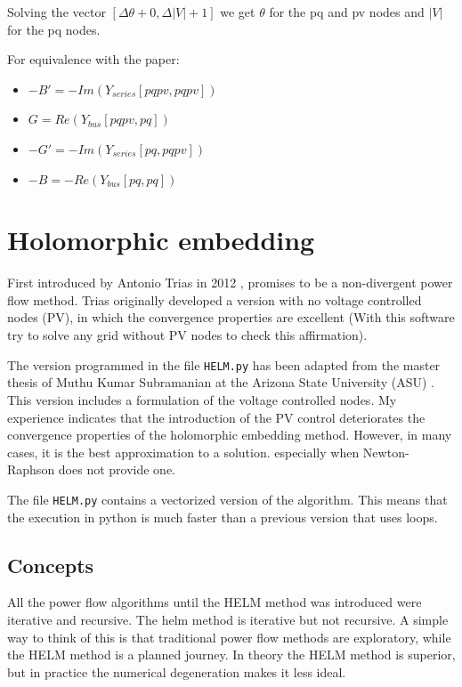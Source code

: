 \documentclass[a4paper,twoside,fleqn]{tufte-book}
\begin{document}
Solving the vector $[\Delta \theta + 0, \Delta |V| + 1]$ we get $\theta$ for the pq and pv nodes and $|V|$ for the pq nodes.\newline

For equivalence with the paper:\newline

\begin{itemize}
	\item $-B' = -Im(Y_{series}[pqpv, pqpv])$
	\item $G = Re(Y_{bus}[pqpv, pq])$
	\item $-G' = -Im(Y_{series}[pq, pqpv])$
	\item $-B = -Re(Y_{bus}[pq, pq])$\newline
\end{itemize}


\section{Holomorphic embedding}

First introduced by Antonio Trias in 2012 \cite{TriasHELM}, promises to be a non-divergent power flow method. Trias originally developed a version with no voltage controlled nodes (PV), in which the convergence properties are excellent (With this software try to solve any grid without PV nodes to check this affirmation). 

The version programmed in the file \verb|HELM.py| has been adapted from the master thesis of Muthu Kumar Subramanian at the Arizona State University (ASU) \cite{subramanian2014application}. This version includes a formulation of the voltage controlled nodes. My experience indicates that the introduction of the PV control deteriorates the convergence properties of the holomorphic embedding method. However, in many cases, it is the best approximation to a solution. especially when Newton-Raphson does not provide one.

The file \verb|HELM.py| contains a vectorized version of the algorithm. This means that the execution in python is much faster than a previous version that uses loops.

\subsection{Concepts}

All the power flow algorithms until the HELM method was introduced were iterative and recursive. The helm method is iterative but not recursive. A simple way to think of this is that traditional power flow methods are exploratory, while the HELM method is a planned journey. In theory the HELM method is superior, but in practice the numerical degeneration makes it less ideal.
\end{document}
